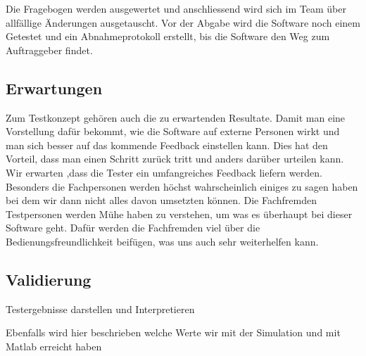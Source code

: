Die Fragebogen werden ausgewertet und anschliessend wird sich im Team über allfällige Änderungen ausgetauscht. 
Vor der Abgabe wird die Software noch einem Getestet und ein Abnahmeprotokoll erstellt, bis die Software den Weg zum Auftraggeber findet.
   
\subsection{Erwartungen} \label{subsec:erwartungen}
Zum Testkonzept gehören auch die zu erwartenden Resultate. Damit man eine Vorstellung dafür bekommt, wie die Software auf externe Personen wirkt und man sich besser auf das kommende Feedback einstellen kann. Dies hat den Vorteil, dass man einen Schritt zurück tritt und anders darüber urteilen kann. 
Wir erwarten ,dass die Tester ein umfangreiches Feedback liefern werden. Besonders die Fachpersonen werden höchst wahrscheinlich einiges zu sagen haben bei dem wir dann nicht alles davon umsetzten können. Die Fachfremden Testpersonen werden Mühe haben zu verstehen, um was es überhaupt bei dieser Software geht. Dafür werden die Fachfremden viel über die Bedienungsfreundlichkeit
beifügen, was uns auch sehr weiterhelfen kann.



\subsection{Validierung} \label{subsec:validierung}
Testergebnisse darstellen und Interpretieren

Ebenfalls wird hier beschrieben welche Werte wir mit der Simulation und mit Matlab erreicht haben
